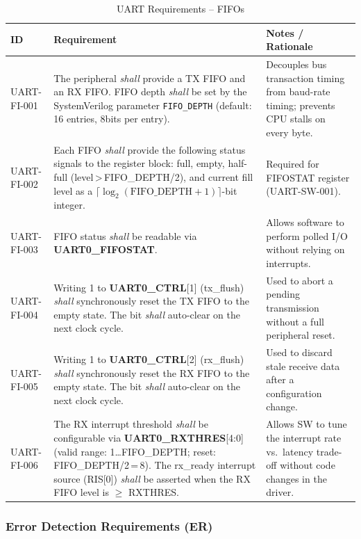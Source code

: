 \begin{table}[H]
\caption{UART Requirements -- FIFOs}
\label{tab:asUartReqFI}
\centering
\begin{tabularx}{\textwidth}{|l |X |X|}
  \hline
  ID & Requirement & Notes / Rationale \\
  \hline
  \hline
  UART-FI-001 &
    The peripheral \textit{shall} provide a TX FIFO and an RX FIFO.
    FIFO depth \textit{shall} be set by the SystemVerilog parameter
    \texttt{FIFO\_DEPTH} (default: 16 entries, 8\;bits per entry). &
    Decouples bus transaction timing from baud-rate timing; prevents
    CPU stalls on every byte. \\
  \hline
  UART-FI-002 &
    Each FIFO \textit{shall} provide the following status signals to the
    register block: full, empty, half-full (level\,>\,FIFO\_DEPTH/2),
    and current fill level as a $\lceil\log_2(\text{FIFO\_DEPTH}+1)\rceil$-bit
    integer. &
    Required for FIFOSTAT register (UART-SW-001). \\
  \hline
  UART-FI-003 &
    FIFO status \textit{shall} be readable via \textbf{UART0\_FIFOSTAT}. &
    Allows software to perform polled I/O without relying on interrupts. \\
  \hline
  UART-FI-004 &
    Writing 1 to \textbf{UART0\_CTRL}[1] (tx\_flush) \textit{shall}
    synchronously reset the TX FIFO to the empty state.
    The bit \textit{shall} auto-clear on the next clock cycle. &
    Used to abort a pending transmission without a full peripheral reset. \\
  \hline
  UART-FI-005 &
    Writing 1 to \textbf{UART0\_CTRL}[2] (rx\_flush) \textit{shall}
    synchronously reset the RX FIFO to the empty state.
    The bit \textit{shall} auto-clear on the next clock cycle. &
    Used to discard stale receive data after a configuration change. \\
  \hline
  UART-FI-006 &
    The RX interrupt threshold \textit{shall} be configurable via
    \textbf{UART0\_RXTHRES}[4:0] (valid range: 1\ldots FIFO\_DEPTH;
    reset: FIFO\_DEPTH/2\,=\,8).
    The rx\_ready interrupt source (RIS[0]) \textit{shall} be asserted when
    the RX FIFO level is $\geq$ RXTHRES. &
    Allows SW to tune the interrupt rate vs.\ latency trade-off without
    code changes in the driver. \\
  \hline
\end{tabularx}
\end{table}

\subsubsection{Error Detection Requirements (ER)}

